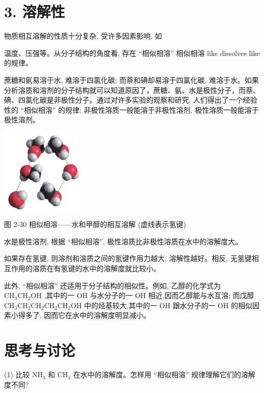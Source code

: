 \documentclass[10pt]{article}
\begin{document}
\section*{3. 溶解性}

物质相互溶解的性质十分复杂, 受许多因素影响, 如

温度、压强等。从分子结构的角度看, 存在 “相似相溶” 相似相溶 like dissolves like 的规律。

蔗糖和氨易溶于水, 难溶于四氯化碳; 而萘和碘却易溶于四氯化碳, 难溶于水。如果分析溶质和溶剂的分子结构就可以知道原因了，蔗糖、氨、水是极性分子，而萘、碘、四氯化碳是非极性分子。通过对许多实验的观察和研究, 人们得出了一个经验性的 “相似相溶” 的规律: 非极性溶质一般能溶于非极性溶剂, 极性溶质一般能溶于极性溶剂。

\begin{center}
\includegraphics[max width=0.3\textwidth]{images/0190e026-5a11-7df7-bd27-54d09026ba7a_62_448837.jpg}
\end{center}

图 2-30 相似相溶——水和甲醇的相互溶解 (虚线表示氢键)

水是极性溶剂, 根据 “相似相溶”, 极性溶质比非极性溶质在水中的溶解度大。

如果存在氢键, 则溶剂和溶质之间的氢键作用力越大, 溶解性越好。相反, 无氢键相互作用的溶质在有氢键的水中的溶解度就比较小。

此外, “相似相溶” 还适用于分子结构的相似性。例如, 乙醇的化学式为 \({\mathrm{{CH}}}_{3}{\mathrm{{CH}}}_{2}\mathrm{{OH}}\) ,其中的一 \(\mathrm{{OH}}\) 与水分子的一 \(\mathrm{{OH}}\) 相近,因而乙醇能与水互溶; 而戊醇 \({\mathrm{{CH}}}_{3}{\mathrm{{CH}}}_{2}{\mathrm{{CH}}}_{2}{\mathrm{{CH}}}_{2}{\mathrm{{CH}}}_{2}\mathrm{{OH}}\) 中的烃基较大,其中的一 \(\mathrm{{OH}}\) 跟水分子的一 \(\mathrm{{OH}}\) 的相似因素小得多了, 因而它在水中的溶解度明显减小。

\section*{思考与讨论}

(1) 比较 \({\mathrm{{NH}}}_{3}\) 和 \({\mathrm{{CH}}}_{4}\) 在水中的溶解度。怎样用 “相似相溶” 规律理解它们的溶解度不同?
\end{document}
